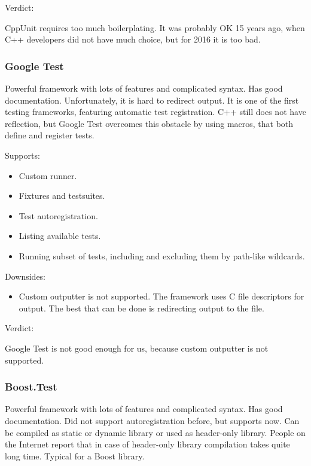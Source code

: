 \documentclass[10pt, a5paper]{article}
\begin{document}
Verdict:

CppUnit requires too much boilerplating. It was probably OK 15 years ago, when C++ developers did not have much choice, but for 2016 it is too bad.

\subsubsection*{Google Test}

Powerful framework with lots of features and complicated syntax. Has good documentation. Unfortunately, it is hard to redirect output. It is one of the first testing frameworks, featuring automatic test \linebreak registration. C++ still does not have reflection, but Google Test \linebreak overcomes this obstacle by using macros, that both define and register tests.

Supports:

\begin{itemize}
  \item Custom runner.
  \item Fixtures and testsuites.
  \item Test autoregistration.
  \item Listing available tests.
  \item Running subset of tests, including and excluding them by path-like wildcards.
\end{itemize}

Downsides:

\begin{itemize}
  \item Custom outputter is not supported. The framework uses C file descriptors for output. The best that can be done is redirecting output to the file.
\end{itemize}

Verdict:

Google Test is not good enough for us, because custom outputter is not supported.

\subsubsection*{Boost.Test}

Powerful framework with lots of features and complicated syntax. Has good documentation. Did not support autoregistration before, but supports now. Can be compiled as static or dynamic library or used as header-only library. People on the Internet report that in case of header-only library compilation takes quite long time. Typical for a Boost library.
\end{document}
